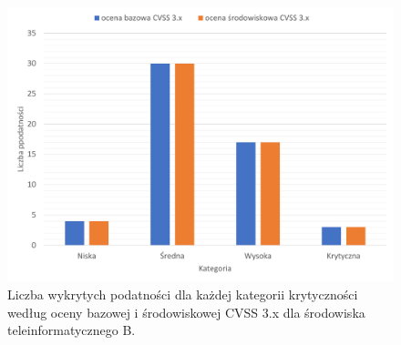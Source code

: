 \begin{figure}[!ht]
\centering
\includegraphics[width=.9\textwidth]{Chapters/Eksperymenty/env_B_results/cvss_3.pdf}
\caption{Liczba wykrytych podatności dla każdej kategorii krytyczności według oceny bazowej i środowiskowej CVSS 3.x dla środowiska teleinformatycznego B.}
\label{fig:chapter6:env_b:cvss_3}
\end{figure}



